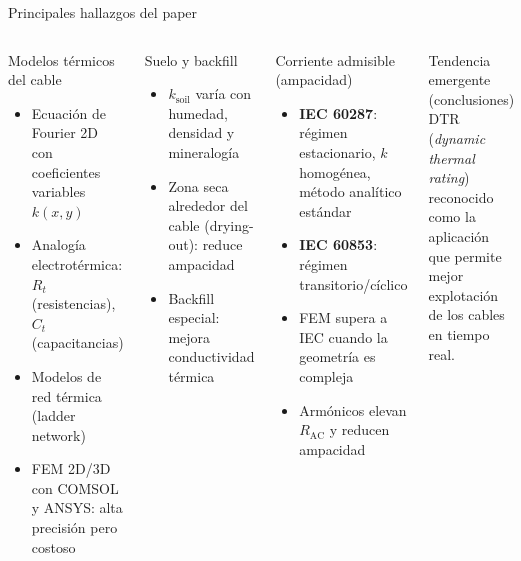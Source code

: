 \documentclass[aspectratio=169]{beamer}
\begin{document}
\begin{frame}{Principales hallazgos del paper}
  \begin{columns}[T]
      \begin{block}{Modelos térmicos del cable}
        \begin{itemize}\footnotesize
          \item Ecuación de Fourier 2D con coeficientes variables $k(x,y)$
          \item Analogía electrotérmica: $R_t$ (resistencias), $C_t$ (capacitancias)
          \item Modelos de red térmica (ladder network)
          \item FEM 2D/3D con COMSOL y ANSYS: alta precisión pero costoso
        \end{itemize}
      \end{block}
      \begin{block}{Suelo y backfill}
        \begin{itemize}\footnotesize
          \item $k_\text{soil}$ varía con humedad, densidad y mineralogía
          \item Zona seca alrededor del cable (drying-out): reduce ampacidad
          \item Backfill especial: mejora conductividad térmica
        \end{itemize}
      \end{block}
      \begin{block}{Corriente admisible (ampacidad)}
        \begin{itemize}\footnotesize
          \item \textbf{IEC 60287}: régimen estacionario, $k$ homogénea, método
                analítico estándar
          \item \textbf{IEC 60853}: régimen transitorio/cíclico
          \item FEM supera a IEC cuando la geometría es compleja
          \item Armónicos elevan $R_\text{AC}$ y reducen ampacidad
        \end{itemize}
      \end{block}
      \begin{alertblock}{Tendencia emergente (conclusiones)}
        \footnotesize
        DTR (\textit{dynamic thermal rating}) reconocido como la aplicación
        que permite mejor explotación de los cables en tiempo real.
      \end{alertblock}
  \end{columns}
\end{frame}
\end{document}
